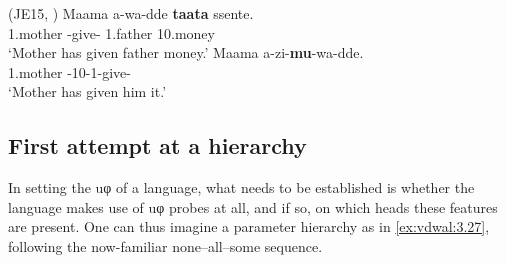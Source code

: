 \documentclass[output=paper]{langsci/langscibook}
\begin{document}
\ea\label{ex:vdwal:3.25}  (JE15, \citealt[67, 72]{Ssekiryango2006})\label{bkm:Ref286389666}
    \ea
    \gll Maama  a-wa-dde  \textbf{taata}  ssente.\\
        1.mother  \First\Sm{}-give-\Pfv{}  1.father  10.money\\
    \glt    ‘Mother has given father money.’
    \ex
    \gll Maama  a-zi-\textbf{mu}-wa-dde. \\
        1.mother  \First\Sm{}{}-10\Om{}-1\Om{}-give-\Pfv{} \\
    \glt    ‘Mother has given him it.’
    \z
\ex\label{ex:vdwal:3.26}\label{bkm:Ref347511825}
\z

\subsection{First attempt at a hierarchy}\label{sub:3.3.2}

In setting the uφ  of a language, what needs to be established is
whether the language makes use of uφ probes at all, and if so, on which heads
these features are present. One can thus imagine a parameter hierarchy as in
\eqref{ex:vdwal:3.27}, following the now-familiar none--all--some
sequence.
\end{document}
